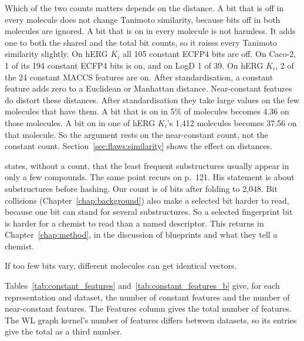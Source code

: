 Which of the two counts matters depends on the distance. A bit that is off in every molecule does not change Tanimoto similarity, because bits off in both molecules are ignored. A bit that is on in every molecule is not harmless. It adds one to both the shared and the total bit counts, so it raises every Tanimoto similarity slightly. On hERG $K_i$ all 105 constant ECFP4 bits are off. On Caco-2, 1 of its 194 constant ECFP4 bits is on, and on LogD 1 of 39. On hERG $K_i$, 2 of the 24 constant MACCS features are on. After standardisation, a constant feature adds zero to a Euclidean or Manhattan distance. Near-constant features do distort these distances. After standardisation they take large values on the few molecules that have them. A bit that is on in 5\% of molecules becomes 4.36 on those molecules. A bit on in one of hERG $K_i$'s 1,412 molecules becomes 37.56 on that molecule. So the argument rests on the near-constant count, not the constant count. Section~\ref{sec:flaws:similarity} shows the effect on distances.

\citet[p.~112]{Dablander2024} states, without a count, that the least frequent substructures usually appear in only a few compounds. The same point recurs on p.~121. His statement is about substructures before hashing. Our count is of bits after folding to 2,048. Bit collisions (Chapter~\ref{chap:background}) also make a selected bit harder to read, because one bit can stand for several substructures. So a selected fingerprint bit is harder for a chemist to read than a named descriptor. This returns in Chapter~\ref{chap:method}, in the discussion of blueprints and what they tell a chemist.

If too few bits vary, different molecules can get identical vectors.

Tables~\ref{tab:constant_features} and~\ref{tab:constant_features_b} give, for each representation and dataset, the number of constant features and the number of near-constant features. The Features column gives the total number of features. The WL graph kernel's number of features differs between datasets, so its entries give the total as a third number.

